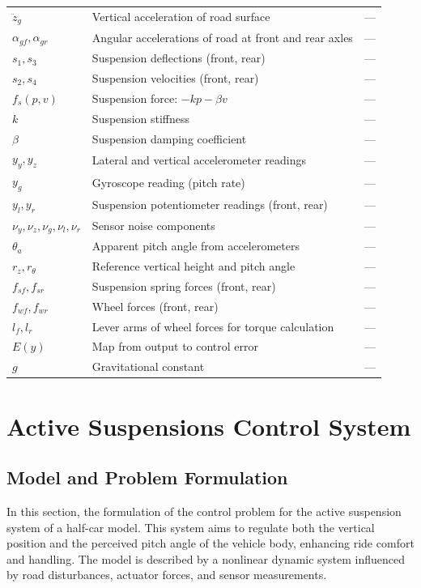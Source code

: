 \documentclass[]{report}
\begin{document}
\begin{table}[H]
\begin{tabular}{lll}
		$\ddot{z}_g$ & Vertical acceleration of road surface & --- \\
		$\alpha_{gf}, \alpha_{gr}$ & Angular accelerations of road at front and rear axles & --- \\
		$s_1, s_3$ & Suspension deflections (front, rear) & --- \\
		$s_2, s_4$ & Suspension velocities (front, rear) & --- \\
		$f_s(p, v)$ & Suspension force: $-kp - \beta v$ & --- \\
		$k$ & Suspension stiffness & --- \\
		$\beta$ & Suspension damping coefficient & --- \\
		$y_y, y_z$ & Lateral and vertical accelerometer readings & --- \\
		$y_g$ & Gyroscope reading (pitch rate) & --- \\
		$y_l, y_r$ & Suspension potentiometer readings (front, rear) & --- \\
		$\nu_y, \nu_z, \nu_g, \nu_l, \nu_r$ & Sensor noise components & --- \\
		$\theta_a$ & Apparent pitch angle from accelerometers & --- \\
		$r_z, r_\theta$ & Reference vertical height and pitch angle & --- \\
		$f_{sf}, f_{sr}$ & Suspension spring forces (front, rear) & --- \\
		$f_{wf}, f_{wr}$ & Wheel forces (front, rear) & --- \\
		$l_f, l_r$ & Lever arms of wheel forces for torque calculation & --- \\
		$E(y)$ & Map from output to control error & --- \\
		$g$ & Gravitational constant & --- \\
		\bottomrule
	\end{tabular}
\end{table}
	
	\chapter{Active Suspensions Control System}

	
	\section{Model and Problem Formulation}
	In this section, the formulation of the control problem for the active suspension system of a half-car model. This system aims to regulate both the vertical position and the perceived pitch angle of the vehicle body, enhancing ride comfort and handling. The model is described by a nonlinear dynamic system influenced by road disturbances, actuator forces, and sensor measurements.
	
\end{document}
